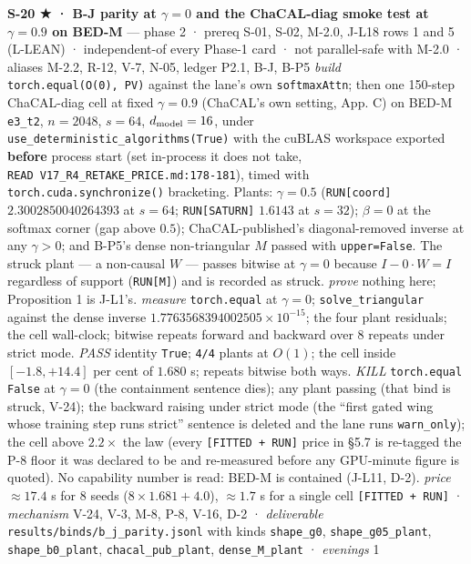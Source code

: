 \documentclass[11pt,a4paper]{article}
\theoremstyle{plain}
\theoremstyle{definition}
\theoremstyle{remark}
\begin{document}
\textbf{S-20 ★ · B-J parity at \(\gamma=0\) and the ChaCAL-diag smoke
test at \(\gamma=0.9\) on BED-M} --- phase 2 · prereq S-01, S-02, M-2.0,
J-L18 rows 1 and 5 (L-LEAN) · independent-of every Phase-1 card · not
parallel-safe with M-2.0 · aliases M-2.2, R-12, V-7, N-05, ledger P2.1,
B-J, B-P5 \emph{build} \texttt{torch.equal(O(0),\ PV)} against the
lane's own \texttt{softmaxAttn}; then one 150-step ChaCAL-diag cell at
fixed \(\gamma=0.9\) (ChaCAL's own setting, \citep{fagnou-2024-chacal}
App. C) on BED-M \texttt{e3\_t2}, \(n=2048\), \(s=64\),
\(d_{\rm model}=16\), under
\texttt{use\_deterministic\_algorithms(True)} with the cuBLAS workspace
exported \textbf{before} process start (set in-process it does not take,
\texttt{READ\ V17\_R4\_RETAKE\_PRICE.md:178-181}), timed with
\texttt{torch.cuda.synchronize()} bracketing. Plants: \(\gamma=0.5\)
(\texttt{RUN{[}coord{]}} \(2.3002850040264393\) at \(s=64\);
\texttt{RUN{[}SATURN{]}} \(1.6143\) at \(s=32\)); \(\beta=0\) at the
softmax corner (gap above \(0.5\)); ChaCAL-published's diagonal-removed
inverse at any \(\gamma>0\); and B-P5's dense non-triangular \(M\)
passed with \texttt{upper=False}. The struck plant --- a non-causal
\(W\) --- passes bitwise at \(\gamma=0\) because \(I-0\cdot W=I\)
regardless of support (\texttt{RUN{[}M{]}}) and is recorded as struck.
\emph{prove} nothing here; Proposition 1 is J-L1's. \emph{measure}
\texttt{torch.equal} at \(\gamma=0\); \texttt{solve\_triangular} against
the dense inverse \(1.7763568394002505\times10^{-15}\); the four plant
residuals; the cell wall-clock; bitwise repeats forward and backward
over 8 repeats under strict mode. \emph{PASS} identity \texttt{True};
\texttt{4/4} plants at \(O(1)\); the cell inside \([-1.8, +14.4]\) per
cent of \(1.680\) s; repeats bitwise both ways. \emph{KILL}
\texttt{torch.equal} \texttt{False} at \(\gamma=0\) (the containment
sentence dies); any plant passing (that bind is struck, V-24); the
backward raising under strict mode (the ``first gated wing whose
training step runs strict'' sentence is deleted and the lane runs
\texttt{warn\_only}); the cell above \(2.2\times\) the law (every
\texttt{{[}FITTED\ +\ RUN{]}} price in §5.7 is re-tagged the P-8 floor
it was declared to be and re-measured before any GPU-minute figure is
quoted). No capability number is read: BED-M is contained (J-L11, D-2).
\emph{price} \(\approx 17.4\) s for 8 seeds (\(8\times1.681+4.0\)),
\(\approx1.7\) s for a single cell \texttt{{[}FITTED\ +\ RUN{]}} ·
\emph{mechanism} V-24, V-3, M-8, P-8, V-16, D-2 · \emph{deliverable}
\texttt{results/binds/b\_j\_parity.jsonl} with kinds \texttt{shape\_g0},
\texttt{shape\_g05\_plant}, \texttt{shape\_b0\_plant},
\texttt{chacal\_pub\_plant}, \texttt{dense\_M\_plant} · \emph{evenings}
1
\end{document}
